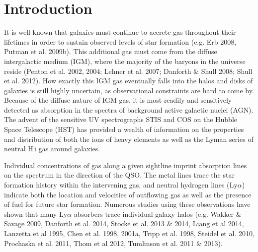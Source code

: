 \documentclass[iop]{emulateapj-rtx4}
\begin{document}
\section{Introduction}

It is well known that galaxies must continue to accrete gas throughout their lifetimes in order to sustain observed levels of star formation (e.g. Erb 2008, Putman et al. 2009b). This additional gas must come from the diffuse intergalactic medium (IGM), where the majority of the baryons in the universe reside (Penton et al. 2002, 2004; Lehner et al. 2007; Danforth $\&$ Shull 2008; Shull et al. 2012). How exactly this IGM gas eventually falls into the halos and disks of galaxies is still highly uncertain, as observational constraints are hard to come by. Because of the diffuse nature of IGM gas, it is most readily and sensitively detected as absorption in the spectra of background active galactic nuclei (AGN). The advent of the sensitive UV spectrographs STIS and COS on the Hubble Space Telescope (HST) has provided a wealth of information on the properties and distribution of both the ions of heavy elements as well as the Lyman series of neutral H\,{\sc i} gas around galaxies. 

Individual concentrations of gas along a given sightline imprint absorption lines on the spectrum in the direction of the QSO. The metal lines trace the star formation history within the intervening gas, and neutral hydrogen lines (Ly$\alpha$) indicate both the location and velocities of outflowing gas as well as the presence of fuel for future star formation. Numerous studies using these observations have shown that many Ly$\alpha$ absorbers trace individual galaxy halos (e.g. Wakker $\&$ Savage 2009, Danforth et al. 2014, Stocke et al. 2013 $\&$ 2014, Liang et al 2014, Lanzetta et al 1995, Chen et al. 1998, 2001a, Tripp et al. 1998, Steidel et al. 2010, Prochaska et al. 2011, Thom et al 2012, Tumlinson et al. 2011 $\&$ 2013). 


\end{document}
